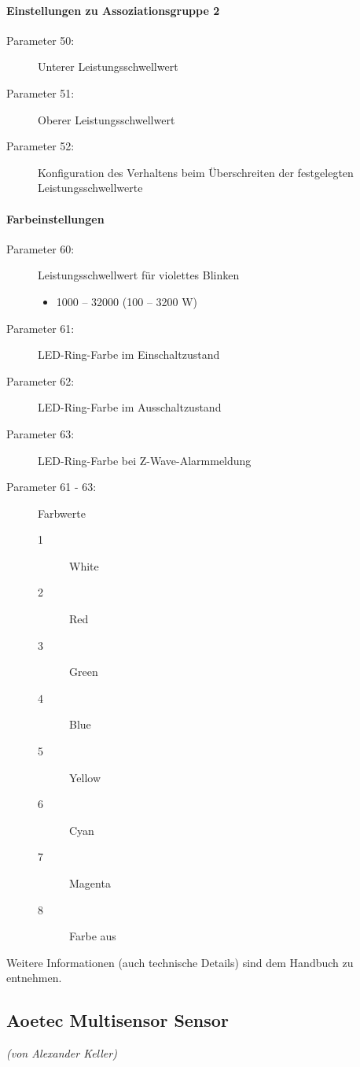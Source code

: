 \paragraph{Einstellungen zu Assoziationsgruppe 2}
\begin{description}
	\item [Parameter 50:] Unterer Leistungsschwellwert
	\item [Parameter 51:] Oberer Leistungsschwellwert
	\item [Parameter 52:] Konfiguration des Verhaltens beim Überschreiten der festgelegten Leistungsschwellwerte
\end{description}

\paragraph{Farbeinstellungen}
\begin{description}
	\item[Parameter 60:] Leistungsschwellwert für violettes Blinken
	\begin{itemize}
		\item 1000 – 32000 (100 – 3200 W)
	\end{itemize}
	\item [Parameter 61:] LED-Ring-Farbe im Einschaltzustand
	\item [Parameter 62:] LED-Ring-Farbe im Ausschaltzustand
	\item [Parameter 63:] LED-Ring-Farbe bei Z-Wave-Alarmmeldung
	\item [Parameter 61 - 63:] Farbwerte
	\begin{description}
		\item [1] White
		\item [2] Red
		\item [3] Green
		\item [4] Blue
		\item [5] Yellow
		\item [6] Cyan
		\item [7] Magenta
		\item [8] Farbe aus
	\end{description}
\end{description}
Weitere Informationen (auch technische Details) sind dem Handbuch zu entnehmen.


\subsection{Aoetec Multisensor Sensor}
\emph{(von Alexander Keller)}

